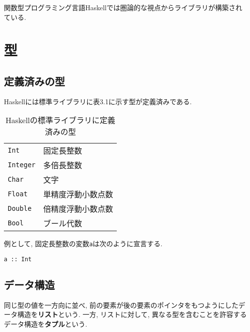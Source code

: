 関数型プログラミング言語Haskellでは圏論的な視点からライブラリが構築されている.
\section{型}
\subsection{定義済みの型}
Haskellには標準ライブラリに表3.1に示す型が定義済みである.
\begin{table}[h]
\caption{Haskellの標準ライブラリに定義済みの型}
\begin{center}
\begin{tabular}{ll}
\verb|Int|&固定長整数\\
\verb|Integer|&多倍長整数 \\
\verb|Char|&文字\\
\verb|Float|&単精度浮動小数点数\\
\verb|Double|&倍精度浮動小数点数\\
\verb|Bool|&ブール代数\\
\end{tabular}
\end{center}
\end{table}

例として, 固定長整数の変数\verb|a|は次のように宣言する.
\begin{lstlisting}
a :: Int
\end{lstlisting}

\subsection{データ構造}
同じ型の値を一方向に並べ, 前の要素が後の要素のポインタをもつようにしたデータ構造を{\bf リスト}という.
一方, リストに対して, 異なる型を含むことを許容するデータ構造を{\bf タプル}という.

